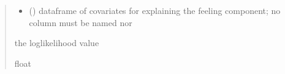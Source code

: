 \documentclass[letterpaper,10pt,english]{sphinxmanual}
\begin{document}
\begin{fulllineitems}
\begin{quote}
\begin{description}
\begin{itemize}
\item {} 
\sphinxAtStartPar
{} () \textendash{} dataframe of covariates for explaining the feeling component;
no column must be named  nor 

\end{itemize}

\sphinxAtStartPar
the log\sphinxhyphen{}likelihood value

\sphinxAtStartPar
float

\end{description}\end{quote}

\end{fulllineitems}

\end{document}
